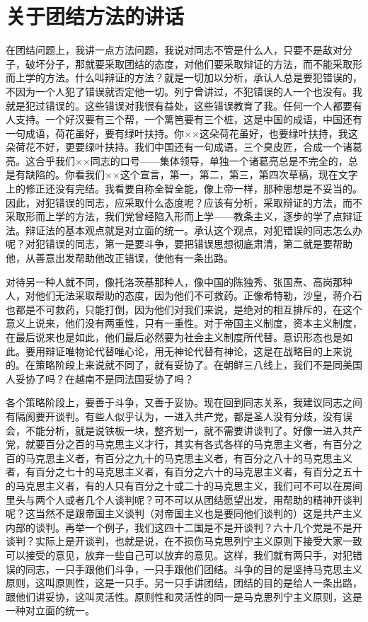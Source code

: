 \section[关于团结方法的讲话（一九六四年八月）]{关于团结方法的讲话}


在团结问题上，我讲一点方法问题，我说对同志不管是什么人，只要不是敌对分子，破坏分子，那就要采取团结的态度，对他们要采取辩证的方法，而不能采取形而上学的方法。什么叫辩证的方法？就是一切加以分析，承认人总是要犯错误的，不因为一个人犯了错误就否定他一切。列宁曾讲过，不犯错误的人一个也没有。我就是犯过错误的。这些错误对我很有益处，这些错误教育了我。任何一个人都要有人支持。一个好汉要有三个帮，一个篱笆要有三个桩，这是中国的成语，中国还有一句成语，荷花虽好，要有绿叶扶持。你××这朵荷花虽好，也要绿叶扶持，我这朵荷花不好，更要绿叶扶持。我们中国还有一句成语，三个臭皮匠，合成一个诸葛亮。这合乎我们××同志的口号——集体领导，单独一个诸葛亮总是不完全的，总是有缺陷的。你看我们××这个宣言，第一，第二，第三，第四次草稿，现在文字上的修正还没有完结。我看要自称全智全能，像上帝一样，那种思想是不妥当的。因此，对犯错误的同志，应采取什么态度呢？应该有分析，采取辩证的方法，而不采取形而上学的方法，我们党曾经陷入形而上学——教条主义，逐步的学了点辩证法。辩证法的基本观点就是对立面的统一。承认这个观点，对犯错误的同志怎么办呢？对犯错误的同志，第一是要斗争，要把错误思想彻底肃清，第二就是要帮助他，从善意出发帮助他改正错误，使他有一条出路。

对待另一种人就不同，像托洛茨基那种人，像中国的陈独秀、张国焘、高岗那种人，对他们无法采取帮助的态度，因为他们不可救药。正像希特勒，沙皇，蒋介石也都是不可救药，只能打倒，因为他们对我们来说，是绝对的相互排斥的，在这个意义上说来，他们没有两重性，只有一重性。对于帝国主义制度，资本主义制度，在最后说来也是如此，他们最后必然要为社会主义制度所代替。意识形态也是如此。要用辩证唯物论代替唯心论，用无神论代替有神论，这是在战略目的上来说的。在策略阶段上来说就不同了，就有妥协了。在朝鲜三八线上，我们不是同美国人妥协了吗？在越南不是同法国妥协了吗？

各个策略阶段上，要善于斗争，又善于妥协。现在回到同志关系，我建议同志之间有隔阂要开谈判。有些人似乎认为，一进入共产党，都是圣人没有分歧，没有误会，不能分析，就是说铁板一块，整齐划一，就不需要讲谈判了。好像一进入共产党，就要百分之百的马克思主义才行，其实有各式各样的马克思主义者，有百分之百的马克思主义者，有百分之九十的马克思主义者，有百分之八十的马克思主义者，有百分之七十的马克思主义者，有百分之六十的马克思主义者，有百分之五十的马克思主义者，有的人只有百分之十或二十的马克思主义，我们可不可以在房间里头与两个人或者几个人谈判呢？可不可以从团结愿望出发，用帮助的精神开谈判呢？这当然不是跟帝国主义谈判（对帝国主义也是要同他们谈判的）这是共产主义内部的谈判。再举一个例子，我们这四十二国是不是开谈判？六十几个党是不是开谈判？实际上是开谈判，也就是说，在不损伤马克思列宁主义原则下接受大家一致可以接受的意见，放弃一些自己可以放弃的意见。这样，我们就有两只手，对犯错误的同志，一只手跟他们斗争，一只手跟他们团结。斗争的目的是坚持马克思主义原则，这叫原则性，这是一只手。另一只手讲团结，团结的目的是给人一条出路，跟他们讲妥协，这叫灵活性。原则性和灵活性的同一是马克思列宁主义原则，这是一种对立面的统一。

